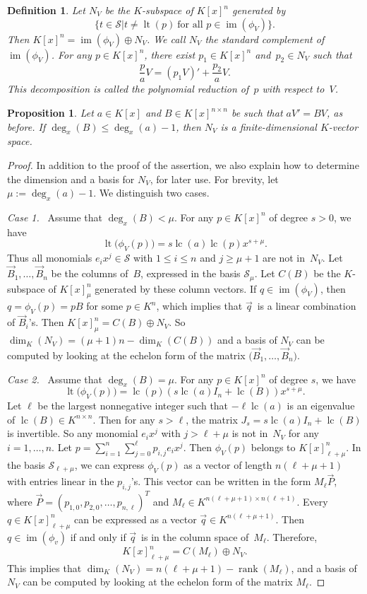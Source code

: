 \documentclass{sig-alternate}
\newtheorem{prop}[theorem]{Proposition}
\newtheorem{defi}[theorem]{Definition}
\newcommand{\cS}{ {\mathcal S}}
\def\lc{\operatorname{lc}}
\def\rank{\operatorname{rank}}
\def\lt{\operatorname{lt}}
\def\im{\operatorname{im}}
\begin{document}
\begin{defi}
Let $N_V$ be the $K$-subspace of $K[x]^n$ generated by
\[
  \bigl\{t \in \cS \mathrel{\big|} t \neq \lt(p) \ \text{for all $p\in \im(\phi_V)$}\bigr\}.
\]
Then $K[x]^n = \im(\phi_V) \oplus N_V$.
We call $N_V$ the \emph{standard complement} of $\im(\phi_V)$.
For any $p\in K[x]^n$, there exist $p_1\in K[x]^n$ and~$p_2\in N_V$ such that
\[\frac{p}{a}V = (p_1V)' + \frac{p_2}{a}V.\]
This decomposition is called the \emph{polynomial reduction} of~$p$
with respect to~$V$.
\end{defi}

\begin{prop}\label{PROP:finite}
Let $a\in K[x]$ and $B\in K[x]^{n \times n}$ be such that $aV'=BV$, as before.
If $\deg_x(B) \leq \deg_x(a)-1$, then $N_V$ is a finite-dimensional
$K$-vector space.
\end{prop}
\begin{proof}
In addition to the proof of the assertion, we also explain how to determine
the dimension and a basis for $N_V$, for later use. For brevity, let
$\mu:=\deg_x(a)-1$. We distinguish two cases.

\smallskip
{\it Case 1.}~
Assume that $\deg_x(B) < \mu$. For any $p\in K[x]^n$ of degree $s>0$, we have
\[
  \lt\bigl(\phi_V(p)\bigr) = s\lc(a)\lc(p)x^{s+\mu}.
\]
Thus all monomials $e_i x^j\in \cS$ with $1\leq i\leq n$ and $j\geq \mu+1$ are not in~$N_V$.
Let $\vec{B}_1, \ldots, \vec{B}_n$ be the columns of~$B$, expressed in the basis $\cS_\mu$.
Let $C(B)$ be the $K$-subspace of $K[x]_\mu^n$ generated by these column vectors.
If $q\in \im(\phi_V)$, then $q = \phi_V(p) = pB$ for some $p \in K^n$, which implies that
$\vec{q}\,$ is a linear combination of $\vec{B}_i$'s. Then $K[x]_\mu^n = C(B) \oplus N_V$.
So $\dim_K(N_V)= (\mu+1)n - \dim_K(C(B))$ and a basis of $N_V$ can be computed by
looking at the echelon form of the matrix $\bigl(\vec{B}_1, \ldots, \vec{B}_n\bigr)$.

\smallskip
{\it Case 2.}~
Assume that $\deg_x(B) =\mu$. For any $p\in K[x]^n$ of degree $s$, we have
\[
  \lt\bigl(\phi_V(p)\bigr) = \lc(p)(s\lc(a)I_n + \lc(B))x^{s+\mu}.
\]
Let $\ell$ be the largest nonnegative integer such that $-\ell \lc(a)$ is an
eigenvalue of $\lc(B)\in K^{n\times n}$. Then for any $s>\ell$,
the matrix $J_s = s\lc(a)I_n + \lc(B)$ is invertible. So any monomial $e_ix^j$ with $j> \ell+\mu$ is not in~$N_V$
for any $i=1, \ldots, n$. Let $p = \sum_{i=1}^n \sum_{j=0}^{\ell} p_{i, j} e_ix^j$.
Then $\phi_V(p)$ belongs to $K[x]_{\ell+\mu}^n$.
In the basis $\cS_{\ell+\mu}$, we can
express $\phi_V(p)$ as a vector of length ${n(\ell+\mu+1)}$ with entries linear in the $p_{i, j}$'s.
This vector can be written in the form $M_{\ell} \vec{P}$,
where $\vec{P} = (p_{1, 0}, p_{2, 0}, \ldots, p_{n, \ell})^T$ and $M_{\ell} \in K^{n(\ell+\mu +1) \times n(\ell+1)}$.
Every $q\in K[x]_{\ell+\mu}^n$ can be expressed as a vector $\vec{q} \in K^{n(\ell + \mu +1)}$.
Then $q\in\im(\phi_v)$ if and only if $\vec{q}\,$ is in the column space of~$M_{\ell}$.
Therefore,
\[K[x]_{\ell+\mu}^n = C({M_{\ell}}) \oplus N_V. \]
This implies that $\dim_K(N_V) = n(\ell+\mu+1) - \rank({M_{\ell}})$, and
a basis of $N_V$ can be computed by
looking at the echelon form of the matrix ${M_{\ell}}$.
\end{proof}
\end{document}
